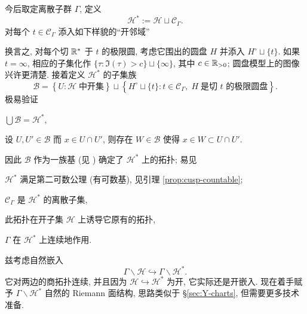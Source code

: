今后取定离散子群 $\Gamma$, 定义 
\[ \mathcal{H}^* := \mathcal{H} \sqcup \mathcal{C}_\Gamma. \]
对每个 $t \in \mathcal{C}_\Gamma$ 添入如下样貌的``开邻域''
\begin{center}\end{center}
换言之, 对每个切 $\mathbb{R}^*$ 于 $t$ 的极限圆, 考虑它围出的圆盘 $H$ 并添入 $H^\circ \sqcup \{t\}$. 如果 $t=\infty$, 相应的子集化作 $\{\tau: \Im(\tau) > c \} \sqcup \{\infty\}$, 其中 $c \in \mathbb{R}_{>0}$; 圆盘模型上的图像兴许更清楚. 接着定义 $\mathcal{H}^*$ 的子集族 
\[ \mathscr{B} = \left\{ U: \mathcal{H}\; \text{中开集} \right\} \sqcup \left\{H^\circ \sqcup \{t \}: t \in \mathcal{C}_\Gamma, \; H\; \text{是切 $t$ 的极限圆盘} \right\}. \]
极易验证
\begin{inparaenum}[(1)]
	\item $\bigcup \mathcal{B} = \mathcal{H}^*$,
	\item 设 $U, U' \in \mathcal{B}$ 而 $x \in U \cap U'$, 则存在 $W \in \mathcal{B}$ 使得 $x \in W \subset U \cap U'$.
\end{inparaenum}
因此 $\mathcal{B}$ 作为一族基 (见 \cite[\S 2.6]{Xiong}) 确定了 $\mathcal{H}^*$ 上的拓扑; 易见
\begin{compactitem}
	\item $\mathcal{H}^*$ 满足第二可数公理 (有可数基), 见引理 \ref{prop:cusp-countable};
	\item $\mathcal{C}_\Gamma$ 是 $\mathcal{H}^*$ 的离散子集,
	\item 此拓扑在开子集 $\mathcal{H}$ 上诱导它原有的拓扑,
	\item $\Gamma$ 在 $\mathcal{H}^*$ 上连续地作用.
\end{compactitem}

兹考虑自然嵌入
\[ \Gamma \backslash \mathcal{H} \hookrightarrow \Gamma \backslash \mathcal{H}^*. \]
它对两边的商拓扑连续, 并且因为 $\mathcal{H} \hookrightarrow \mathcal{H}^*$ 为开, 它实际还是开嵌入. 现在着手赋予 $\Gamma \backslash \mathcal{H}^*$ 自然的 Riemann 面结构, 思路类似于 \S\ref{sec:Y-charts}, 但需要更多技术准备.

